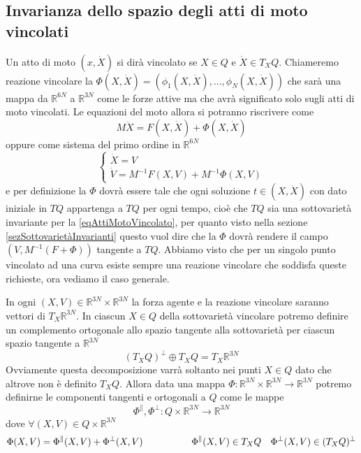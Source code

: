 \documentclass[11pt,a4paper,twoside]{book}
\theoremstyle{esss}
\theoremstyle{dotless}
\numberwithin{equation}{section} %
\begin{document}
\subsection{Invarianza dello spazio degli atti di moto vincolati} \label{sezInvarianzaSpazioVincolato}
Un atto di moto $(x,\dot{X})$ si dirà vincolato se $X\in Q$ e $\dot{X}\in T_XQ$. Chiameremo reazione vincolare la $\Phi(X,\dot{X})=(\phi_1(X,\dot{X}),...,\phi_N(X,\dot{X}))$ che sarà una mappa da $\mathbb{R}^{6N}$ a $\mathbb{R}^{3N}$ come le forze attive ma che avrà significato solo sugli atti di moto vincolati.
Le equazioni del moto allora si potranno riscrivere come
\begin{equation}
M\ddot{X}=F(X,\dot{X})+\Phi(X,\dot{X})
\end{equation}
oppure come sistema del primo ordine in $\mathbb{R}^{6N}$
\begin{equation}\label{eqAttiMotoVincolato}
\begin{cases}
\dot{X}=V \\
\dot{V}=M^{-1}F(X,V)+M^{-1}\Phi(X,V)
\end{cases}
\end{equation}
e per definizione la $\Phi$ dovrà essere tale che ogni soluzione $t\in(X,\dot{X})$ con dato iniziale in $TQ$ appartenga a $TQ$ per ogni tempo, cioè che $TQ$ sia una sottovarietà invariante per la \eqref{eqAttiMotoVincolato}, per quanto visto nella sezione \ref{sezSottovarietàInvarianti} questo vuol dire che la $\Phi$ dovrà rendere il campo $\left(V,M^{-1}(F+\Phi)\right)$ tangente a $TQ$. Abbiamo visto che per un singolo punto vincolato ad una curva esiste sempre una reazione vincolare che soddisfa queste richieste, ora vediamo il caso generale.

In ogni $(X,V)\in\mathbb{R}^{3N}\times\mathbb{R}^{3N}$ la forza agente e la reazione vincolare saranno vettori di $T_X\mathbb{R}^{3N}$. In ciascun $X\in Q$ della sottovarietà vincolare potremo definire un complemento ortogonale allo spazio tangente alla sottovarietà per ciascun spazio tangente a $\mathbb{R}^{3N}$
\[
\left(T_XQ\right)^\perp \oplus T_XQ = T_X\mathbb{R}^{3N}
\]
Ovviamente questa decomposizione varrà soltanto nei punti $X\in Q$ dato che altrove non è definito $T_X Q$.
Allora data una mappa $\Phi:\mathbb{R}^{3N}\times\mathbb{R}^{3N}\rightarrow\mathbb{R}^{3N}$ potremo definirne le componenti tangenti e ortogonali a $Q$ come le mappe
\[
\Phi^\parallel , \Phi^\perp : Q\times\mathbb{R}^{3N}\rightarrow \mathbb{R}^{3N}
\]
dove $\forall (X,V)\in Q\times\mathbb{R}^{3N}$
\[
\Phi(X,V)=\Phi^\parallel(X,V) + \Phi^\perp (X,V) \hspace{0.15\linewidth} \Phi^\parallel(X,V)\in T_XQ \quad \Phi^\perp(X,V)\in (T_XQ)^\perp
\]
\end{document}
